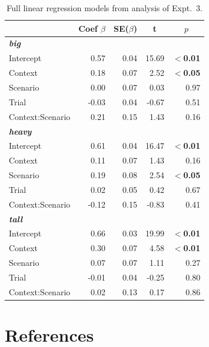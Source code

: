 \documentclass[preprint,12pt,authoryear,titlepage]{elsarticle}
\begin{document}
\begin{table}[htb] 
	\renewcommand\thetable{C.1}
	\centering \caption{Full linear regression models from analysis of Expt.~3.} \label{expt3analysis}
	\begin{tabular}{lrrrr}\toprule
		&	Coef $\beta$	&	SE($\beta$)	&	\multicolumn{1}{c}{ \textbf{t}}	&	\multicolumn{1}{c}{$p$}\\ \midrule
		\emph{\textbf{big}} \\
		Intercept 			& 	0.57 &	0.04	&	15.69	&	\textbf{$<$0.01} \\
		Context			&	0.18	&   0.07	&	2.52&	\textbf{$<$0.05} \\
		Scenario			&	0.00&   0.07	&	0.03	&	0.97 \\
		Trial				&	-0.03	&   0.04	&	-0.67	&	0.51 \\
		Context:Scenario	&	0.21	&   0.15	&	1.43	&	0.16 \\ \hline
		\emph{\textbf{heavy}}\\
		Intercept 			& 	0.61 &	0.04	&	16.47	&	\textbf{$<$0.01} \\
		Context			&	0.11	&   0.07	&	1.43	&	0.16\\
		Scenario			&	0.19&   0.08	&	2.54	&	\textbf{$<$0.05}  \\
		Trial				&	0.02	&   0.05	&	0.42&	0.67 \\
		Context:Scenario	&	-0.12	&   0.15	&	-0.83	&	0.41 \\ \hline
		\emph{\textbf{tall}}\\
		Intercept 			& 	0.66 &	0.03	&	19.99	&	\textbf{$<$0.01} \\
		Context			&	0.30	&   0.07	&	4.58&	\textbf{$<$0.01} \\
		Scenario			&	0.07&   0.07	&	1.11	&	0.27 \\
		Trial				&	-0.01	&   0.04	&	-0.25	&	0.80 \\
		Context:Scenario	&	0.02	&   0.13	&	0.17	&	0.86 \\ 
		\bottomrule
	\end{tabular}
\end{table}

\section*{References}

   
  


%
%
%
\end{document}
